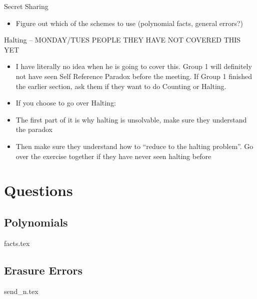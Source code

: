\documentclass{exam}
\begin{document}
\begin{questions}
\item Secret Sharing
\begin{itemize}
\item Figure out which of the schemes to use (polynomial facts, general errors?)
\end{itemize}

\item Halting -- MONDAY/TUES PEOPLE THEY HAVE NOT COVERED THIS YET
\begin{itemize}
\item I have literally no idea when he is going to cover this. Group 1 will definitely not have seen Self Reference Paradox before the meeting. If Group 1 finished the earlier section, ask them if they want to do Counting or Halting.
\item If you choose to go over Halting:
\item The first part of it is why halting is unsolvable, make sure they understand the paradox
\item Then make sure they understand how to “reduce to the halting problem”. Go over the exercise together if they have never seen halting before
\end{itemize}

\end{questions}

\section{Questions}
\subsection{Polynomials}
\begin{enumerate}
{facts.tex}
\end{enumerate}

\subsection{Erasure Errors}
\begin{enumerate}
{send_n.tex}
\end{enumerate}
\end{document}
